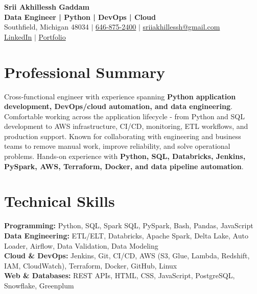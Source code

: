 \documentclass[letterpaper,10pt]{article}
\begin{document}
\fontsize{9.35pt}{10.45pt}\selectfont

\begin{center}
    {\LARGE \textbf{Srii Akhillessh Gaddam}} \\[-1pt]
    \textbf{Data Engineer | Python | DevOps | Cloud} \\[2pt]
    Southfield, Michigan 48034 $|$
    \href{tel:6468752400}{646-875-2400} $|$
    \href{mailto:sriiakhillessh@gmail.com}{sriiakhillessh@gmail.com} \\[1pt]
    \href{https://www.linkedin.com/in/srii-akhiilessh-gaddam-b48668191/}{LinkedIn} $|$
    \href{https://sriiakhillesshg.github.io/portfolio/}{Portfolio}
\end{center}
\vspace{-8pt}

\section{Professional Summary}
\small{Cross-functional engineer with experience spanning \textbf{Python application development, DevOps/cloud automation, and data engineering}. Comfortable working across the application lifecycle - from Python and SQL development to AWS infrastructure, CI/CD, monitoring, ETL workflows, and production support. Known for collaborating with engineering and business teams to remove manual work, improve reliability, and solve operational problems. Hands-on experience with \textbf{Python, SQL, Databricks, Jenkins, PySpark, AWS, Terraform, Docker, and data pipeline automation}.}

\section{Technical Skills}
\small{
\textbf{Programming:} Python, SQL, Spark SQL, PySpark, Bash, Pandas, JavaScript \\
\textbf{Data Engineering:} ETL/ELT, Databricks, Apache Spark, Delta Lake, Auto Loader, Airflow, Data Validation, Data Modeling \\
\textbf{Cloud \& DevOps:} Jenkins, Git, CI/CD, AWS (S3, Glue, Lambda, Redshift, IAM, CloudWatch), Terraform, Docker, GitHub, Linux \\
\textbf{Web \& Databases:} REST APIs, HTML, CSS, JavaScript, PostgreSQL, Snowflake, Greenplum
}

\end{document}
